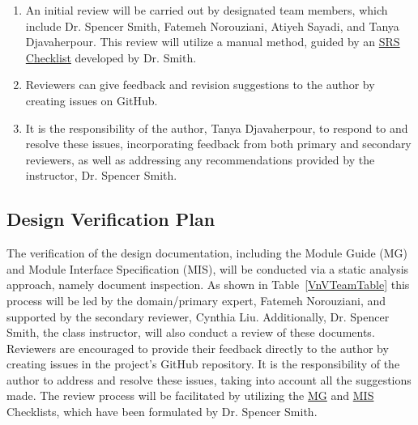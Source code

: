 \documentclass[12pt, titlepage]{article}
\begin{document}
\begin{enumerate}
  \item An initial review will be carried out by designated team members, which include Dr. 
    Spencer Smith, Fatemeh Norouziani, Atiyeh Sayadi, and Tanya Djavaherpour. 
    This review will utilize a manual method, guided by an 
    \href{https://github.com/smiths/capTemplate/blob/9251702fdcb9800c59f6ed3d11d91e2bd62fca6d/docs/Checklists/SRS-Checklist.pdf}
    {SRS Checklist} developed by Dr. Smith.
  \item Reviewers can give feedback and revision suggestions to the author by creating issues on GitHub.
  \item It is the responsibility of the author, Tanya Djavaherpour, to respond to and 
  resolve these issues, incorporating feedback from both primary and secondary reviewers, 
  as well as addressing any recommendations provided by the instructor, Dr. Spencer Smith.
\end{enumerate}



\subsection{Design Verification Plan}\label{DesignVerPlan}

The verification of the design documentation, including the Module Guide (MG) 
and Module Interface Specification (MIS), will be conducted via a static 
analysis approach, namely document inspection. As shown in Table~\ref{VnVTeamTable}
this process will be led by 
the domain/primary expert, Fatemeh Norouziani, and supported by the secondary 
reviewer, Cynthia Liu. Additionally, Dr. Spencer Smith, the class instructor, 
will also conduct a review of these documents. Reviewers are encouraged to 
provide their feedback directly to the author by creating issues in the 
project's GitHub repository. It is the responsibility of the author to 
address and resolve these issues, taking into account all the suggestions 
made. The review process will be facilitated by utilizing the 
\href{https://github.com/smiths/capTemplate/blob/9251702fdcb9800c59f6ed3d11d91e2bd62fca6d/docs/Checklists/MG-Checklist.pdf}{MG} 
and \href{https://github.com/smiths/capTemplate/blob/9251702fdcb9800c59f6ed3d11d91e2bd62fca6d/docs/Checklists/MIS-Checklist.pdf}{MIS} 
Checklists, which have been formulated by Dr. Spencer Smith.
\end{document}
